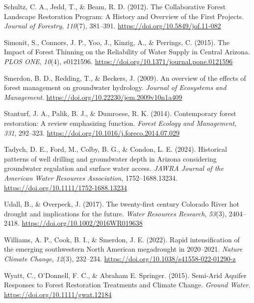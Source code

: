 \documentclass[
]{agujournal2019}
\newlength{\cslhangindent}
\newenvironment{CSLReferences}[2] %
 {\begin{list}{}{%
  \setlength{\itemindent}{0pt}
  \setlength{\leftmargin}{0pt}
  \setlength{\parsep}{0pt}
  \ifodd #1
   \setlength{\leftmargin}{\cslhangindent}
   \setlength{\itemindent}{-1\cslhangindent}
  \fi
  \setlength{\itemsep}{#2\baselineskip}}}
 {\end{list}}
\begin{document}
\begin{CSLReferences}{1}{0}
Schultz, C. A., Jedd, T., \& Beam, R. D. (2012). The {Collaborative}
{Forest} {Landscape} {Restoration} {Program}: {A} {History} and
{Overview} of the {First} {Projects}. \emph{Journal of Forestry},
\emph{110}(7), 381--391. \url{https://doi.org/10.5849/jof.11-082}

Simonit, S., Connors, J. P., Yoo, J., Kinzig, A., \& Perrings, C.
(2015). The {Impact} of {Forest} {Thinning} on the {Reliability} of
{Water} {Supply} in {Central} {Arizona}. \emph{PLOS ONE}, \emph{10}(4),
e0121596. \url{https://doi.org/10.1371/journal.pone.0121596}

Smerdon, B. D., Redding, T., \& Beckers, J. (2009). An overview of the
effects of forest management on groundwater hydrology. \emph{Journal of
Ecosystems and Management}.
\url{https://doi.org/10.22230/jem.2009v10n1a409}

Stanturf, J. A., Palik, B. J., \& Dumroese, R. K. (2014). Contemporary
forest restoration: A review emphasizing function. \emph{Forest Ecology
and Management}, \emph{331}, 292--323.
\url{https://doi.org/10.1016/j.foreco.2014.07.029}

Tadych, D. E., Ford, M., Colby, B. G., \& Condon, L. E. (2024).
Historical patterns of well drilling and groundwater depth in {Arizona}
considering groundwater regulation and surface water access. \emph{JAWRA
Journal of the American Water Resources Association}, 1752--1688.13234.
\url{https://doi.org/10.1111/1752-1688.13234}

Udall, B., \& Overpeck, J. (2017). The twenty‐first century {Colorado}
{River} hot drought and implications for the future. \emph{Water
Resources Research}, \emph{53}(3), 2404--2418.
\url{https://doi.org/10.1002/2016WR019638}

Williams, A. P., Cook, B. I., \& Smerdon, J. E. (2022). Rapid
intensification of the emerging southwestern {North} {American}
megadrought in 2020--2021. \emph{Nature Climate Change}, \emph{12}(3),
232--234. \url{https://doi.org/10.1038/s41558-022-01290-z}

Wyatt, C., O'Donnell, F. C., \& Abraham E. Springer. (2015). Semi‐{Arid}
{Aquifer} {Responses} to {Forest} {Restoration} {Treatments} and
{Climate} {Change}. \emph{Ground Water}.
\url{https://doi.org/10.1111/gwat.12184}


\end{CSLReferences}
\end{document}
